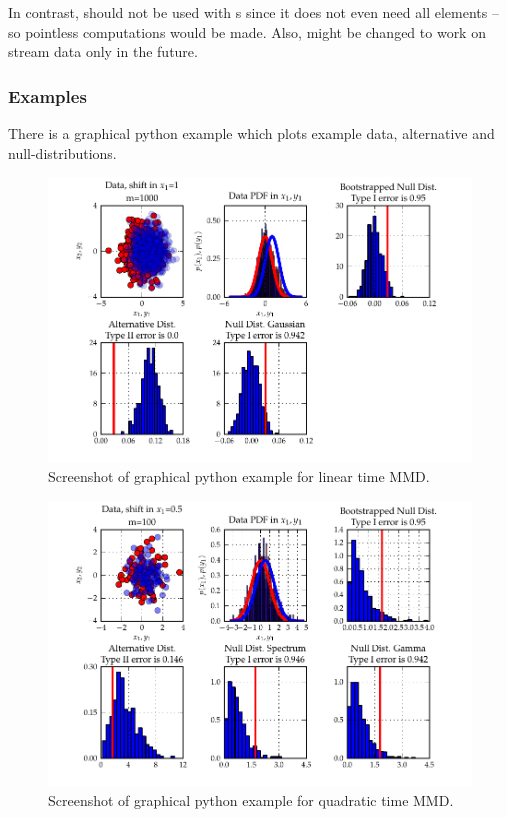 In contrast,  should not be used with s since it does not even need all elements -- so pointless computations would be made. Also,  might be changed to work on stream data only in the future.

\subsubsection{Examples}
There is a graphical python example which plots example data, alternative and null-distributions. 

\begin{figure}\centering
		\includegraphics{fig/statistical_testing/linear_time_mmd}
		\caption{Screenshot of graphical python example for linear time MMD.}
\end{figure}

\begin{figure}\centering
		\includegraphics{fig/statistical_testing/quadratic_time_mmd}
		\caption{Screenshot of graphical python example for quadratic time MMD.}
\end{figure}